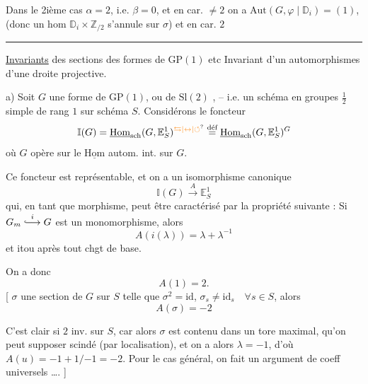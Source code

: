 Dans le 2ième cas $\alpha=2$, i.e. $\beta=0$, et en car. $\ne2$ on a $\mathrm{Aut}(G,\varphi\mid\mathbb D_i)=(1)$, (donc un hom $\mathbb D_i\times\mathbb Z_{/2}$ s'annule sur $\sigma$) et en car. $2$\qquad\rule{3cm}{0.3pt}
\uline{Invariants} des sections des formes de $\mathrm{GP}(1)$ etc
Invariant d'un automorphismes d'une droite projective.

a) Soit $G$ une forme de $\mathrm{GP}(1)$, ou de $\mathrm{Sl}(2)$ , -- i.e. un schéma en groupes $\frac12$ simple de rang $1$ sur schéma $S$. Considérons le foncteur
\[
\mathbb I(G)=\underline{\mathrm{Hom}}_{\rm sch}(G,\mathbb E^1_S)^{\unsure{\leftrightarrows|\leftrightarrow|\circlearrowleft}}
\overset{\text{déf}}{=}\underline{\mathrm{Hom}}_{\rm sch}(G,\mathbb E^1_S)^G
\]
où $G$ opère sur le $\underline{\mathrm{Hom}}$  autom. int. sur $G$.

Ce foncteur est représentable,  et on a un isomorphisme canonique
\[
\mathbb I(G)\xrightarrow{A}\mathbb E^1_S
\]
qui, en tant que morphisme, peut être caractérisé par la propriété suivante : Si $G_m\overset{i}{\lhook\joinrel\longrightarrow}G$ est un monomorphisme, alors
\[
A(i(\lambda))=\lambda+\lambda^{-1}
\]
et itou après tout chgt de base.

 On a donc
\[
A(1)=2.
\]
[    $\sigma$  une section de $G$ sur $S$ telle que $\sigma^2=\mathrm{id}$, $\sigma_s\ne\mathrm{id}_s\quad\forall s\in S$,  alors
\[
A(\sigma)=-2
\]

C'est clair si $2$ inv. sur $S$, car alors $\sigma$ est contenu dans un  tore maximal,  qu'on peut supposer scindé (par localisation), et on a alors $\lambda=-1$, d'où $A(u)=-1+1/{-1}=-2$. Pour le cas général, on fait un argument de coeff universels \ldots. ]


